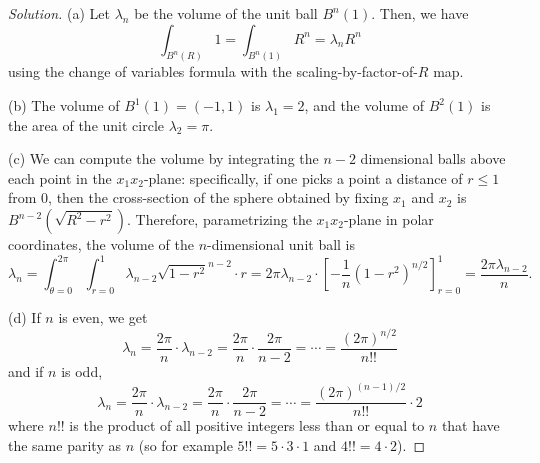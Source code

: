 \documentclass[10pt]{scrartcl}
\newenvironment{soln}{\begin{proof}[Solution]}{\end{proof}}
\begin{document}
\begin{soln}
	(a) Let $\lambda_n$ be the volume of the unit ball $B^n(1)$.
	Then, we have
	\[\int_{B^n(R)} 1
	= \int_{B^n(1)} R^n = \lambda_nR^n\]
	using the change of variables formula with the scaling-by-factor-of-$R$ map.
	
	(b) The volume of $B^1(1) = (-1,1)$ is $\boxed{\lambda_1=2}$,
	and the volume of $B^2(1)$ is the area of the unit circle
	$\boxed{\lambda_2=\pi}$.
	
	(c) We can compute the volume by integrating
	the $n-2$ dimensional balls above each point in the $x_1x_2$-plane:
	specifically, if one picks a point a distance of $r \le 1$ from $0$,
	then the cross-section of the sphere obtained by fixing
	$x_1$ and $x_2$ is $B^{n-2}(\sqrt{R^2-r^2})$. Therefore,
	parametrizing the $x_1x_2$-plane in polar coordinates,
	the volume of the $n$-dimensional unit ball is
	\[\lambda_n = \int_{\theta=0}^{2\pi} \int_{r=0}^1
	\lambda_{n-2}\sqrt{1-r^2}^{n-2}\cdot r
	= 2\pi\lambda_{n-2}\cdot\left[-\frac{1}{n}(1-r^2)^{n/2}\right]_{r=0}^1
	= \frac{2\pi\lambda_{n-2}}{n}.\]
	
	(d) If $n$ is even, we get
	\[\lambda_n = \frac{2\pi}{n}\cdot\lambda_{n-2}
	= \frac{2\pi}{n}\cdot\frac{2\pi}{n-2}
	= \cdots = \frac{(2\pi)^{n/2}}{n!!}\]
	and if $n$ is odd,
	\[\lambda_n = \frac{2\pi}{n}\cdot\lambda_{n-2}
	= \frac{2\pi}{n}\cdot\frac{2\pi}{n-2}
	= \cdots = \frac{(2\pi)^{(n-1)/2}}{n!!}\cdot2\]
	where $n!!$ is the product of all positive integers
	less than or equal to $n$ that have the same parity as $n$
	(so for example $5!! = 5\cdot3\cdot 1$ and $4!! = 4\cdot2$).
\end{soln}
\end{document}
